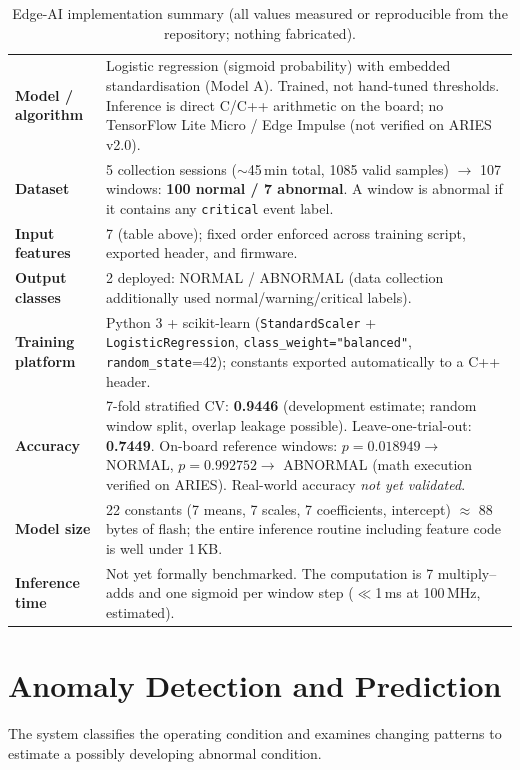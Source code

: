 \documentclass[11pt]{article}
\begin{document}
\begin{table}[ht]
\centering
\begin{tabularx}{\textwidth}{l X}
\toprule
\textbf{Model / algorithm} & Logistic regression (sigmoid probability)
  with embedded standardisation (Model A). Trained, not hand-tuned
  thresholds. Inference is direct C/C++ arithmetic on the board; no
  TensorFlow Lite Micro / Edge Impulse (not verified on ARIES v2.0). \\
\textbf{Dataset} & 5 collection sessions ($\sim$45\,min total,
  1085 valid samples) $\rightarrow$ 107 windows:
  \textbf{100 normal / 7 abnormal}. A window is abnormal if it
  contains any \texttt{critical} event label. \\
\textbf{Input features} & 7 (table above); fixed order enforced across
  training script, exported header, and firmware. \\
\textbf{Output classes} & 2 deployed: NORMAL / ABNORMAL
  (data collection additionally used normal/warning/critical labels). \\
\textbf{Training platform} & Python 3 + scikit-learn
  (\texttt{StandardScaler} + \texttt{LogisticRegression},
  \texttt{class\_weight="balanced"}, \texttt{random\_state}=42);
  constants exported automatically to a C++ header. \\
\textbf{Accuracy} & 7-fold stratified CV: \textbf{0.9446} (development
  estimate; random window split, overlap leakage possible).
  Leave-one-trial-out: \textbf{0.7449}. On-board reference windows:
  $p=0.018949 \rightarrow$ NORMAL, $p=0.992752 \rightarrow$ ABNORMAL
  (math execution verified on ARIES). Real-world accuracy
  \emph{not yet validated}. \\
\textbf{Model size} & 22 constants (7 means, 7 scales, 7 coefficients,
  intercept) $\approx$ 88 bytes of flash; the entire inference routine
  including feature code is well under 1\,KB. \\
\textbf{Inference time} & Not yet formally benchmarked. The computation
  is 7 multiply--adds and one sigmoid per window step
  ($\ll$1\,ms at 100\,MHz, estimated). \\
\bottomrule
\end{tabularx}
\caption{Edge-AI implementation summary (all values measured or
reproducible from the repository; nothing fabricated).}
\end{table}

\section{Anomaly Detection and Prediction}
The system classifies the operating condition and examines changing
patterns to estimate a possibly developing abnormal condition.
\end{document}
